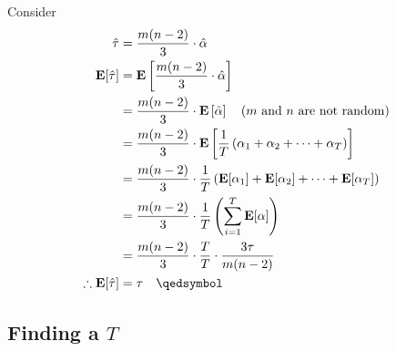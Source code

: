 Consider
\begin{equation*}
\begin{aligned}
  \hat{\tau}
    &= \frac{m(n-2)}{3}\cdot\hat{\alpha} \\
  \mathbf{E}[\hat{\tau}]
    &= \mathbf{E}\left[\frac{m(n-2)}{3}\cdot\hat{\alpha}\right] \\
    &= \frac{m(n-2)}{3}\cdot\mathbf{E}\left[\hat{\alpha}\right] \quad \text{($m$ and $n$ are not random)} \\
    &= \frac{m(n-2)}{3}\cdot\mathbf{E}\left[\frac{1}{T}\left(\alpha_1 + \alpha_2 + \cdots + \alpha_T\right)\right] \\
    &= \frac{m(n-2)}{3}\cdot\frac{1}{T}\left(\mathbf{E}[\alpha_1] + \mathbf{E}[\alpha_2] + \cdots + \mathbf{E}[\alpha_T]\right) \\
    &= \frac{m(n-2)}{3}\cdot\frac{1}{T}\left(\sum_{i=1}^T \mathbf{E}[\alpha]\right) \\
    &= \frac{m(n-2)}{3}\cdot\frac{T}{T}\cdot \frac{3\tau}{m(n-2)} \\
  \therefore \mathbf{E}[\hat{\tau}]
    &= \tau \quad \qedsymbol
\end{aligned}
\end{equation*}

\subsection{Finding a $T$}

